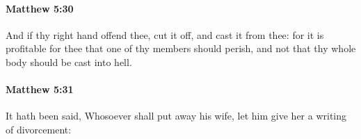		\paragraph{Matthew 5:30} %
			\label{MATTHEW-5-30}

			And if thy right hand offend thee, cut it off, and cast it from thee: for it is profitable for thee that one of thy members should perish, and not that thy whole body should be cast into hell.

			\begin{framed}
			\scriptsize
				\begin{compactdesc}
					\item[SBLG] 
				\end{compactdesc}
			\end{framed}

		\paragraph{Matthew 5:31} %
			\label{MATTHEW-5-31}

			It hath been said, Whosoever shall put away his wife, let him give her a writing of divorcement:


